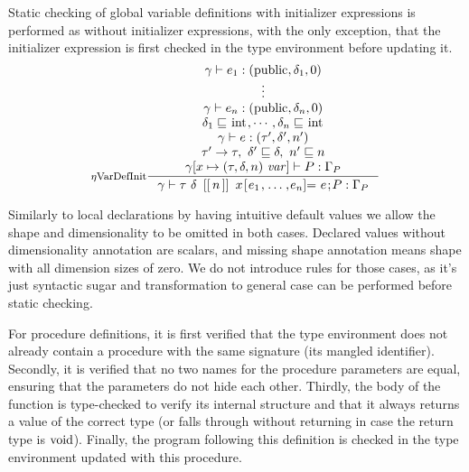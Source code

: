 \documentclass[a4paper, 10pt, draft]{report}
\newcommand{\mycode}[1]{\ensuremath{\mbox{\lstinline{#1}}}}
\begin{document}
Static checking of global variable definitions with initializer expressions is
performed as without initializer expressions, with the only exception, that the
initializer expression is first checked in the type environment before updating
it.
\[ \inference[$\eta$VarDefInit]{
  \gamma |- e_1 : \left( \mycode{public}, \delta_1, 0 \right) \\
  \vdots \\
  \gamma |- e_n : \left( \mycode{public}, \delta_n, 0 \right) \\
  \delta_1 \sqsubseteq \mycode{int}, \cdots, \delta_n \sqsubseteq \mycode{int} \\
  \gamma |- e : \left( \tau', \delta', n' \right) \\
  \tau' \to \tau,\ \delta' \sqsubseteq \delta,\ n' \sqsubseteq n \\
  \gamma[x \mapsto (\tau, \delta, n)\ \mathit{var}] |- P : \Gamma_P
}{
  \gamma |- \tau\ \delta\ \mycode{[[}n\mycode{]]}\ x\mycode{[} e_1 \mycode{,} \ldots \mycode{,} e_n  \mycode{]=}\ e\mycode{;} P : \Gamma_P
} \]

Similarly to local declarations by having intuitive default values we allow the
shape and dimensionality to be omitted in both cases. Declared values without
dimensionality annotation are scalars, and missing shape annotation means shape
with all dimension sizes of zero. We do not introduce rules for those cases, as
it's just syntactic sugar and transformation to general case can be performed
before static checking.

For procedure definitions, it is first verified that the type environment does
not already contain a procedure with the same signature (its mangled
identifier). Secondly, it is verified that no two names for the procedure
parameters are equal, ensuring that the parameters do not hide each other.
Thirdly, the body of the function is type-checked to verify its internal
structure and that it always returns a value of the correct type (or falls
through without returning in case the return type is \mycode{void}).  Finally,
the program following this definition is checked in the type environment
updated with this procedure.
\end{document}
